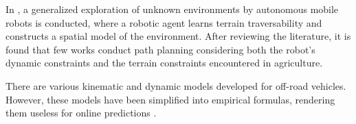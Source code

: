 \documentclass[conference]{IEEEtran}
\begin{document}




In \cite{Milos2022}, a generalized exploration of unknown environments by autonomous mobile robots is conducted, where a robotic agent learns terrain traversability and constructs a spatial model of the environment. After reviewing the literature, it is found that few works conduct path planning considering both the robot's dynamic constraints and the terrain constraints encountered in agriculture.

There are various kinematic and dynamic models developed for off-road vehicles. However, these models have been simplified into empirical formulas, rendering them useless for online predictions \cite{ALMILLI2010151}. 

\end{document}
